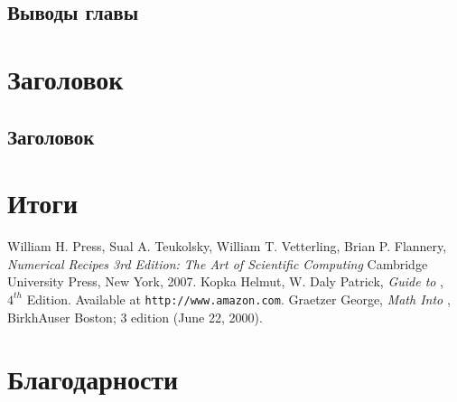 \documentclass[openany]{book}
\theoremstyle{definition}
\begin{document}
\section{Выводы главы}



\chapter{Заголовок}
\pagestyle{fancy}

\section{Заголовок}



\chapter{Итоги}\label{ch7}
\pagestyle{fancy}

\backmatter

\begin{thebibliography}{99}
    \textenglish{William H. Press, Sual A. Teukolsky, William T. Vetterling, Brian P. Flannery, \emph{Numerical Recipes 3rd Edition: The Art of Scientific Computing}
    Cambridge University Press, New York, 2007.}
    \textenglish{Kopka Helmut, W. Daly Patrick,
    \emph{Guide to \text{\LaTeX}}, $4^{th}$ Edition. Available at \texttt{http://www.amazon.com}.}
    \textenglish{Graetzer George, \emph{Math Into \text{\LaTeX}},
    BirkhAuser Boston; 3 edition (June 22, 2000).}    
\end{thebibliography}


\chapter{Благодарности}
\pagestyle{fancy}
\end{document}
